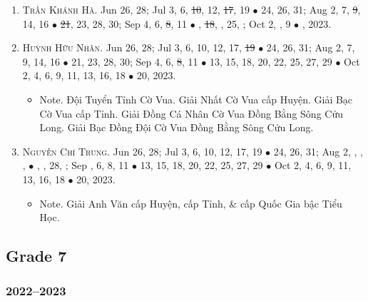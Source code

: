 \documentclass{article}
\begin{document}
\begin{enumerate}
	\item \textsc{Trần Khánh Hà.} {\sf[In]} Jun 26, 28; Jul 3, 6, \st{10}, 12, \st{17}, 19 $\bullet$ 24, 26, 31; Aug 2, 7, \st{9}, 14, 16 $\bullet$ \st{21}, 23, 28, 30; Sep 4, 6, \st{8}, 11 $\bullet$ , \st{18}, , 25, ; Oct 2, , 9 $\bullet$ , 2023.
	\item \textsc{Huỳnh Hữu Nhân.} {\sf[In]} Jun 26, 28; Jul 3, 6, 10, 12, 17, \st{19} $\bullet$ 24, 26, 31; Aug 2, 7, 9, 14, 16 $\bullet$ 21, 23, 28, 30; Sep 4, 6, \st{8}, 11 $\bullet$ 13, 15, 18, 20, 22, 25, 27, 29 $\bullet$ Oct 2, 4, 6, 9, 11, 13, 16, 18 $\bullet$ 20, 2023.
	\begin{itemize}
		\item {\sf Note.} Đội Tuyển Tỉnh Cờ Vua. Giải Nhất Cờ Vua cấp Huyện. Giải Bạc Cờ Vua cấp Tỉnh. Giải Đồng Cá Nhân Cờ Vua Đồng Bằng Sông Cửu Long. Giải Bạc Đồng Đội Cờ Vua Đồng Bằng Sông Cửu Long.
	\end{itemize}
	\item \textsc{Nguyễn Chí Trung.} {\sf[In]} Jun 26, 28; Jul 3, 6, 10, 12, 17, 19 $\bullet$ 24, 26, 31; Aug 2, , , ,  $\bullet$ , , 28, ; Sep , 6, 8, 11 $\bullet$ 13, 15, 18, 20, 22, 25, 27, 29 $\bullet$ Oct 2, 4, 6, 9, 11, 13, 16, 18 $\bullet$ 20, 2023.
	\begin{itemize}
		\item {\sf Note.} Giải Anh Văn cấp Huyện, cấp Tỉnh, \& cấp Quốc Gia bậc Tiểu Học.
	\end{itemize}
\end{enumerate}

\subsection{Grade 7}

\subsubsection{2022--2023}
\end{document}
